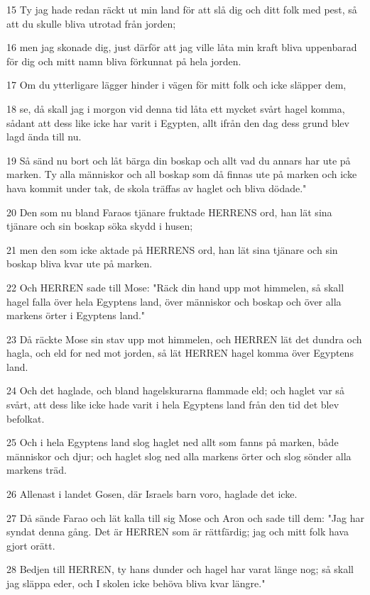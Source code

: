 \par 15 Ty jag hade redan räckt ut min land för att slå dig och ditt folk med pest, så att du skulle bliva utrotad från jorden;
\par 16 men jag skonade dig, just därför att jag ville låta min kraft bliva uppenbarad för dig och mitt namn bliva förkunnat på hela jorden.
\par 17 Om du ytterligare lägger hinder i vägen för mitt folk och icke släpper dem,
\par 18 se, då skall jag i morgon vid denna tid låta ett mycket svårt hagel komma, sådant att dess like icke har varit i Egypten, allt ifrån den dag dess grund blev lagd ända till nu.
\par 19 Så sänd nu bort och låt bärga din boskap och allt vad du annars har ute på marken. Ty alla människor och all boskap som då finnas ute på marken och icke hava kommit under tak, de skola träffas av haglet och bliva dödade."
\par 20 Den som nu bland Faraos tjänare fruktade HERRENS ord, han lät sina tjänare och sin boskap söka skydd i husen;
\par 21 men den som icke aktade på HERRENS ord, han lät sina tjänare och sin boskap bliva kvar ute på marken.
\par 22 Och HERREN sade till Mose: "Räck din hand upp mot himmelen, så skall hagel falla över hela Egyptens land, över människor och boskap och över alla markens örter i Egyptens land."
\par 23 Då räckte Mose sin stav upp mot himmelen, och HERREN lät det dundra och hagla, och eld for ned mot jorden, så lät HERREN hagel komma över Egyptens land.
\par 24 Och det haglade, och bland hagelskurarna flammade eld; och haglet var så svårt, att dess like icke hade varit i hela Egyptens land från den tid det blev befolkat.
\par 25 Och i hela Egyptens land slog haglet ned allt som fanns på marken, både människor och djur; och haglet slog ned alla markens örter och slog sönder alla markens träd.
\par 26 Allenast i landet Gosen, där Israels barn voro, haglade det icke.
\par 27 Då sände Farao och lät kalla till sig Mose och Aron och sade till dem: "Jag har syndat denna gång. Det är HERREN som är rättfärdig; jag och mitt folk hava gjort orätt.
\par 28 Bedjen till HERREN, ty hans dunder och hagel har varat länge nog; så skall jag släppa eder, och I skolen icke behöva bliva kvar längre."

